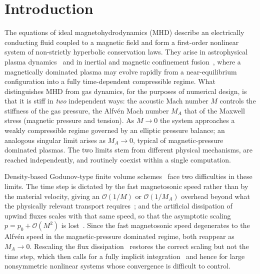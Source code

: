 \documentclass[a4paper,fleqn]{cas-sc}
\theoremstyle{remark}
\begin{document}
\maketitle

\section{Introduction}\label{sec:intro}

The equations of ideal magnetohydrodynamics (MHD) describe an electrically
conducting fluid coupled to a magnetic field and form a first-order nonlinear system
of non-strictly hyperbolic conservation laws. They arise in astrophysical plasma
dynamics~\cite{GoedbloedPoedts2019,Priest2014} and in inertial and magnetic
confinement fusion~\cite{Jardin2010,AtzeniMeyer2004,Slutz2010,Sinars2020}, where a
magnetically dominated plasma may evolve rapidly from a near-equilibrium
configuration into a fully time-dependent compressible regime. What distinguishes
MHD from gas dynamics, for the purposes of numerical design, is that it is stiff in
\emph{two} independent ways: the acoustic Mach number $M$ controls the stiffness of the gas pressure, the
Alfv\'en Mach number $M_A$ that of the Maxwell stress (magnetic pressure and
tension). As
$M\to0$ the system approaches a weakly compressible regime governed by an elliptic
pressure balance; an analogous singular limit arises as $M_A\to0$, typical of
magnetic-pressure dominated plasmas. The two limits stem from different physical
mechanisms, are reached independently, and routinely coexist within a single
computation.

Density-based Godunov-type finite volume schemes~\cite{BrioWu1988,MiyoshiKusano2005}
face two difficulties in these limits. The time step is dictated by the fast
magnetosonic speed rather than by the material velocity, giving an $\mathcal O(1/M)$
or $\mathcal O(1/M_A)$ overhead beyond what the physically relevant transport
requires~\cite{Klein1995}; and the artificial dissipation of upwind fluxes scales
with that same speed, so that the asymptotic scaling $p=p_0+\mathcal O(M^{2})$ is
lost~\cite{GuillardViozat2017,Dellacherie2010}. Since the fast magnetosonic speed
degenerates to the Alfv\'en speed in the magnetic-pressure dominated regime, both
reappear as $M_A\to0$. Rescaling the flux
dissipation~\cite{barsukow2021truly,barsukow2023all} restores the correct scaling but
not the time step, which then calls for a fully implicit
integration~\cite{leidi2022finite,viallet2011towards} and hence for large
nonsymmetric nonlinear systems whose convergence is difficult to control.
\end{document}
